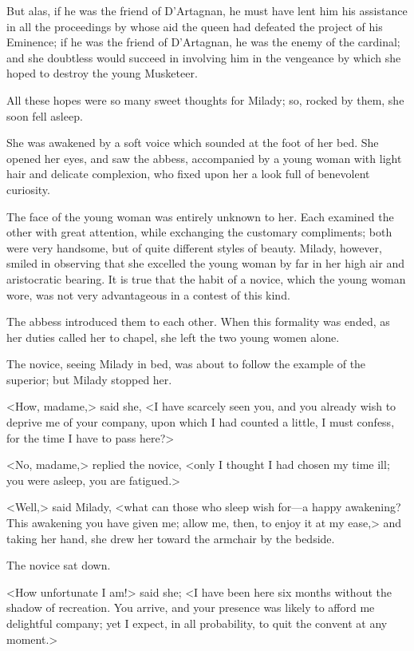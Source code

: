 But alas, if he was the friend of D'Artagnan, he must have lent him his assistance in all the proceedings by whose aid the queen had defeated the project of his Eminence; if he was the friend of D'Artagnan, he was the enemy of the cardinal; and she doubtless would succeed in involving him in the vengeance by which she hoped to destroy the young Musketeer. 

All these hopes were so many sweet thoughts for Milady; so, rocked by them, she soon fell asleep. 

She was awakened by a soft voice which sounded at the foot of her bed. She opened her eyes, and saw the abbess, accompanied by a young woman with light hair and delicate complexion, who fixed upon her a look full of benevolent curiosity. 

The face of the young woman was entirely unknown to her. Each examined the other with great attention, while exchanging the customary compliments; both were very handsome, but of quite different styles of beauty. Milady, however, smiled in observing that she excelled the young woman by far in her high air and aristocratic bearing. It is true that the habit of a novice, which the young woman wore, was not very advantageous in a contest of this kind. 

The abbess introduced them to each other. When this formality was ended, as her duties called her to chapel, she left the two young women alone. 

The novice, seeing Milady in bed, was about to follow the example of the superior; but Milady stopped her. 

<How, madame,> said she, <I have scarcely seen you, and you already wish to deprive me of your company, upon which I had counted a little, I must confess, for the time I have to pass here?> 

<No, madame,> replied the novice, <only I thought I had chosen my time ill; you were asleep, you are fatigued.> 

<Well,> said Milady, <what can those who sleep wish for—a happy awakening? This awakening you have given me; allow me, then, to enjoy it at my ease,> and taking her hand, she drew her toward the armchair by the bedside. 

The novice sat down. 

<How unfortunate I am!> said she; <I have been here six months without the shadow of recreation. You arrive, and your presence was likely to afford me delightful company; yet I expect, in all probability, to quit the convent at any moment.> 

